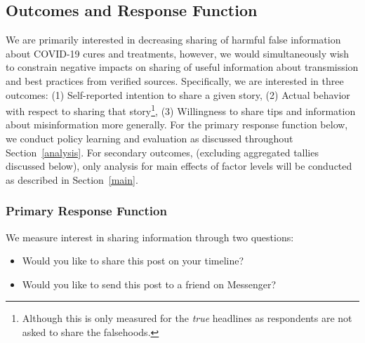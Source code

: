 \documentclass[letterpaper, 12pt, parskip=full,DIV=10]{scrartcl}
\begin{document}





\subsection{Outcomes and Response Function}\label{response}

We are primarily interested in decreasing sharing of harmful false information about COVID-19 cures and treatments, however, we would simultaneously wish to constrain negative impacts on sharing of useful information about transmission and best practices from verified sources. Specifically, we are interested in three outcomes: (1) Self-reported intention to share a given story, (2) Actual behavior with respect to sharing that story\footnote{Although this is only measured for the \textit{true} headlines as respondents are not asked to share the falsehoods.}, (3) Willingness to share tips and information about misinformation more generally. For the primary response function below, we conduct policy learning and evaluation as discussed throughout Section~\ref{analysis}. For secondary outcomes, (excluding aggregated tallies discussed below), only analysis for main effects of factor levels will be conducted as described in Section~\ref{main}.  

\subsubsection{Primary Response Function}%

We measure interest in sharing information through two questions:
\begin{itemize}
\item Would you like to share this post on your timeline? 
\item Would you like to send this post to a friend on Messenger?
\end{itemize}
\end{document}
